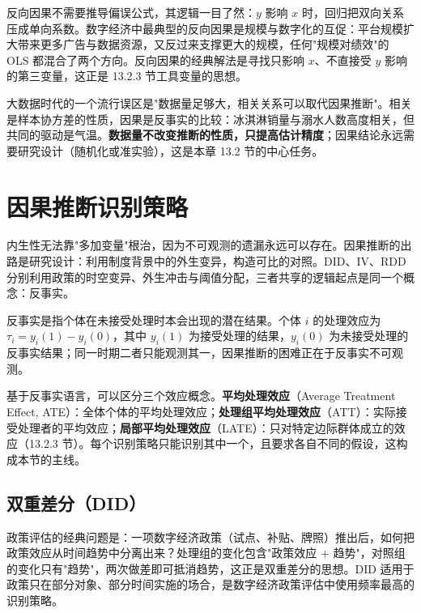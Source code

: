 反向因果不需要推导偏误公式，其逻辑一目了然：$y$ 影响 $x$ 时，回归把双向关系压成单向系数。数字经济中最典型的反向因果是规模与数字化的互促：平台规模扩大带来更多广告与数据资源，又反过来支撑更大的规模，任何"规模对绩效"的 OLS 都混合了两个方向。反向因果的经典解法是寻找只影响 $x$、不直接受 $y$ 影响的第三变量，这正是 13.2.3 节工具变量的思想。

\begin{misconception}
大数据时代的一个流行误区是"数据量足够大，相关关系可以取代因果推断"。相关是样本协方差的性质，因果是反事实的比较：冰淇淋销量与溺水人数高度相关，但共同的驱动是气温。\textbf{数据量不改变推断的性质，只提高估计精度}；因果结论永远需要研究设计（随机化或准实验），这是本章 13.2 节的中心任务。
\end{misconception}

\section{因果推断识别策略}

内生性无法靠"多加变量"根治，因为不可观测的遗漏永远可以存在。因果推断的出路是研究设计：利用制度背景中的外生变异，构造可比的对照。DID、IV、RDD 分别利用政策的时空变异、外生冲击与阈值分配，三者共享的逻辑起点是同一个概念：反事实。

\begin{definition}
反事实是指个体在未接受处理时本会出现的潜在结果。个体 $i$ 的处理效应为 $\tau_i = y_i(1) - y_i(0)$，其中 $y_i(1)$ 为接受处理的结果，$y_i(0)$ 为未接受处理的反事实结果；同一时期二者只能观测其一，因果推断的困难正在于反事实不可观测。
\end{definition}

基于反事实语言，可以区分三个效应概念。\textbf{平均处理效应}（Average Treatment Effect, ATE）：全体个体的平均处理效应；\textbf{处理组平均处理效应}（ATT）：实际接受处理者的平均效应；\textbf{局部平均处理效应}（LATE）：只对特定边际群体成立的效应（13.2.3 节）。每个识别策略只能识别其中一个，且要求各自不同的假设，这构成本节的主线。

\subsection{双重差分（DID）}

政策评估的经典问题是：一项数字经济政策（试点、补贴、牌照）推出后，如何把政策效应从时间趋势中分离出来？处理组的变化包含"政策效应 + 趋势"，对照组的变化只有"趋势"，两次做差即可抵消趋势，这正是双重差分的思想。DID 适用于政策只在部分对象、部分时间实施的场合，是数字经济政策评估中使用频率最高的识别策略。

